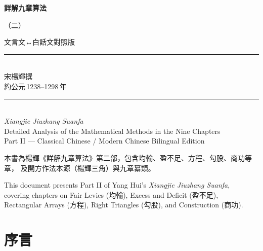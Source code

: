 \documentclass[11pt,a4paper]{article}
\newcommand{\longline}{\noindent\rule{\textwidth}{0.4pt}}
\newcommand{\zhc}{}[1]{{\CJKfamily{\CJKrmdefault}#1}}  %
\newenvironment{prob bilingual}[1][]{%
  \begin{paracol}{2}%
  \setlength{\columnseprule}{0.4pt}%
}{%
  \end{paracol}%
  \medskip%
}
\begin{document}
\begin{titlepage}
\begin{center}

\vspace*{1.5cm}

{\Huge\bfseries\color{titlecolor}
\zhc{詳解九章算法}\\[0.6cm]}

{\LARGE\color{sectioncolor}
\zhc{（二）}\\[0.8cm]}

{\Large\color{notecolor}
\zhc{文言文↔白話文對照版}\\[1.5cm]}

\longline\\[0.8cm]

{\Large\zhc{宋\quad 楊輝\quad 撰}}\\[0.5cm]
{\large 約公元\,1238--1298\,年}\\[1.5cm]

\longline\\[1cm]

{\large\color{sectioncolor}
\textit{Xiangjie Jiuzhang Suanfa}\\[0.3cm]
Detailed Analysis of the Mathematical Methods in the Nine Chapters\\[0.3cm]
Part II --- Classical Chinese / Modern Chinese Bilingual Edition\\[1.5cm]}

\vfill

{\small\zhc{
本書為楊輝《詳解九章算法》第二部，包含均輸、盈不足、方程、勾股、商功等章，
及開方作法本源（楊輝三角）與九章纂類。}}

\vspace{0.5cm}

{\small
This document presents Part II of Yang Hui's \textit{Xiangjie Jiuzhang Suanfa},\\
covering chapters on Fair Levies (\zhc{均輸}), Excess and Deficit (\zhc{盈不足}),\\
Rectangular Arrays (\zhc{方程}), Right Triangles (\zhc{勾股}), and Construction (\zhc{商功}).}

\end{center}
\end{titlepage}

\tableofcontents
\newpage

\section*{\zhc{序言}}
\end{document}
